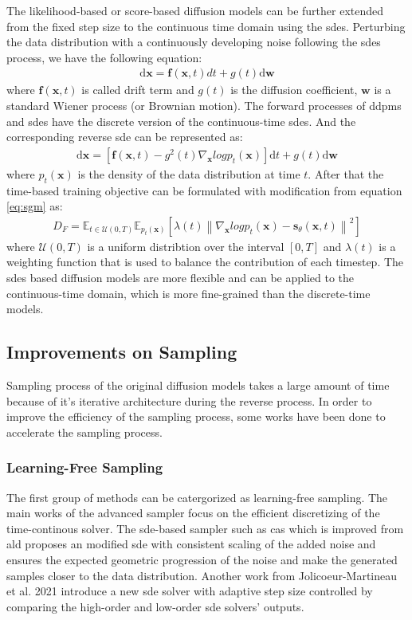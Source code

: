 \documentclass[12pt,DIV14,BCOR12mm,a4paper,footinclude=false,headinclude,parskip=half-,twoside,openright,cleardoublepage=empty,toc=index,bibliography=totoc,listof=totoc]{scrreprt}
\numberwithin{equation}{chapter}
\begin{document}
The likelihood-based or score-based diffusion models can be further extended from the fixed step size to the continuous time domain using the \glspl{sde}. Perturbing the data distribution with a continuously developing noise following the \glspl{sde} process, we have the following equation:
\begin{align}
  \text{d}\mathbf{x}=\mathbf{f}(\mathbf{x},t)dt + g(t)\text{d}\mathbf{w}
\end{align}
where $\mathbf{f}(\mathbf{x},t)$ is called drift term and $g(t)$ is the diffusion coefficient, $\mathbf{w}$ is a standard Wiener process (or Brownian motion). The forward processes of \glspl{ddpm} and \glspl{sde} have the discrete version of the continuous-time \glspl{sde}. And the corresponding reverse \gls{sde} can be represented as:
\begin{align}
  \text{d}\mathbf{x}=\left[\mathbf{f}(\mathbf{x},t)-g^{2}(t)\nabla_{\mathbf{x}}log p_{t}(\mathbf{x})\right]\text{d}t + g(t)\text{d}\mathbf{w}
\end{align}
where $p_{t}(\mathbf{x})$ is the density of the data distribution at time $t$. After that the time-based training objective can be formulated with modification from equation \ref{eq:sgm} as:
\begin{align}
  D_{F} = \mathbb{E}_{t\in \mathcal{U}(0,T)} \mathbb{E}_{p_{t}(\mathbf{x})}\left[\lambda(t)\left\lVert\nabla_{\mathbf{x}}log p_{t}(\mathbf{x}) - \mathbf{s}_{\theta}(\mathbf{x},t)\right\rVert^{2}\right]
\end{align}
where $\mathcal{U}(0,T)$ is a uniform distribtion over the interval $[0,T]$ and $\lambda(t)$ is a weighting function that is used to balance the contribution of each timestep. The \glspl{sde} based diffusion models are more flexible and can be applied to the continuous-time domain, which is more fine-grained than the discrete-time models.
\subsection{Improvements on Sampling}

Sampling process of the original diffusion models takes a large amount of time because of it's iterative architecture during the reverse process. In order to improve the efficiency of the sampling process, some works have been done to accelerate the sampling process.
\subsubsection{Learning-Free Sampling}
The first group of methods can be catergorized as learning-free sampling. The main works of the advanced sampler focus on the efficient discretizing of the time-continous solver. The \gls{sde}-based sampler such as \gls{cas} \cite{jolicoeurmartineau2020adversarial} which is improved from \gls{ald} \cite{dockhorn2022scorebased} proposes an modified \gls{sde} with consistent scaling of the added noise and ensures the expected geometric progression of the noise and make the generated samples closer to the data distribution. Another work from Jolicoeur-Martineau et al. 2021 \cite{jolicoeurmartineau2021gotta} introduce a new \gls{sde} solver with adaptive step size controlled by comparing the high-order and low-order \gls{sde} solvers' outputs.
\end{document}

